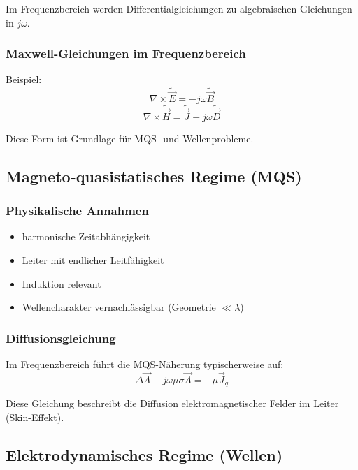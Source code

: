\documentclass[a4paper]{article}
\newcommand{\E}{\vec E}
\newcommand{\D}{\vec D}
\newcommand{\Hf}{\vec H}
\newcommand{\B}{\vec B}
\newcommand{\J}{\vec J}
\newcommand{\A}{\vec A}
\begin{document}
\begin{merke}
Im Frequenzbereich werden Differentialgleichungen zu algebraischen Gleichungen in $j\omega$.
\end{merke}

\subsubsection{Maxwell-Gleichungen im Frequenzbereich}

Beispiel:
\[
\nabla \times \tilde{\E} = -j\omega \tilde{\B}
\]
\[
\nabla \times \tilde{\Hf} = \tilde{\J} + j\omega \tilde{\D}
\]

Diese Form ist Grundlage für MQS- und Wellenprobleme.

\subsection{Magneto-quasistatisches Regime (MQS)}

\subsubsection{Physikalische Annahmen}

\begin{itemize}
  \item harmonische Zeitabhängigkeit
  \item Leiter mit endlicher Leitfähigkeit
  \item Induktion relevant
  \item Wellencharakter vernachlässigbar (Geometrie $\ll \lambda$)
\end{itemize}

\subsubsection{Diffusionsgleichung}

Im Frequenzbereich führt die MQS-Näherung typischerweise auf:
\[
\Delta \A - j\omega \mu \sigma \A = -\mu \J_q
\]

\begin{merke}
Diese Gleichung beschreibt die Diffusion elektromagnetischer Felder im Leiter
(Skin-Effekt).
\end{merke}

\subsection{Elektrodynamisches Regime (Wellen)}
\end{document}
